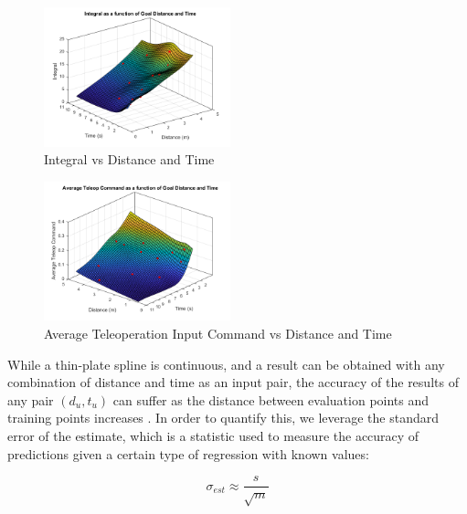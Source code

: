 \documentclass[letterpaper, 10 pt, conference]{ieeeconf}  %
\begin{document}
\begin{figure}[ht]
    \includegraphics[width=0.48\textwidth]{images/integs.png}
    \caption{Integral vs Distance and Time}
    \label{fig:integs}
\end{figure}
\begin{figure}[ht]
    \includegraphics[width=0.48\textwidth]{images/joycmds.png}
    \caption{Average Teleoperation Input Command vs Distance and Time}
    \label{fig:joys}
\end{figure}

While a thin-plate spline is continuous, and a result can be obtained with any combination of distance and time as an input pair, the accuracy of the results of any pair $(d_u,t_u)$ can suffer as the distance between evaluation points and training points increases \cite{regress}. In order to quantify this, we leverage the standard error of the estimate, which is a statistic used to measure the accuracy of predictions given a certain type of regression \cite{stdereg} with known values:

\begin{equation} \label{eq:stderr}
    \sigma_{est} \approx \frac{s}{\sqrt{m}}
\end{equation}
\end{document}
